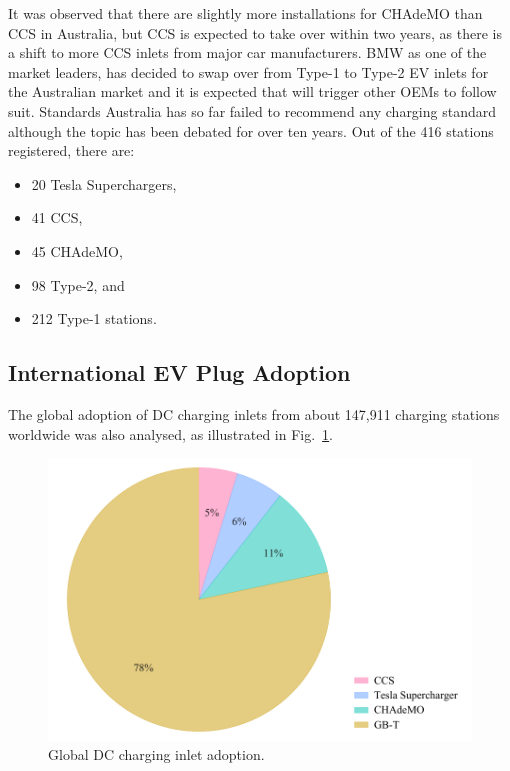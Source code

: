 It was observed that there are slightly more installations for CHAdeMO than CCS in Australia, but CCS is expected to take over within two years, as there is a shift to more CCS inlets from major car manufacturers.
BMW as one of the market leaders, has decided to swap over from Type-1 to Type-2 EV inlets for the Australian market and it is expected that will trigger other OEMs to follow suit. Standards Australia has so far failed to recommend any charging standard although the topic has been debated for over ten years. Out of the 416 stations registered, there are:
\begin{itemize}
	\item 20 Tesla Superchargers,
	\item 41 CCS,
	\item 45 CHAdeMO,
	\item 98 Type-2, and
	\item 212 Type-1 stations. 
\end{itemize}

\subsection{International EV Plug Adoption}
The global adoption of DC charging inlets from about 147,911 charging stations worldwide was also analysed, as illustrated in Fig.~\ref{fig:10:worldplug}.

\begin{figure}[H]
	\centering
	\includegraphics[width=0.7\linewidth]{worldplug}
	\caption{Global DC charging inlet adoption.}
	\label{fig:10:worldplug}
\end{figure}
 
